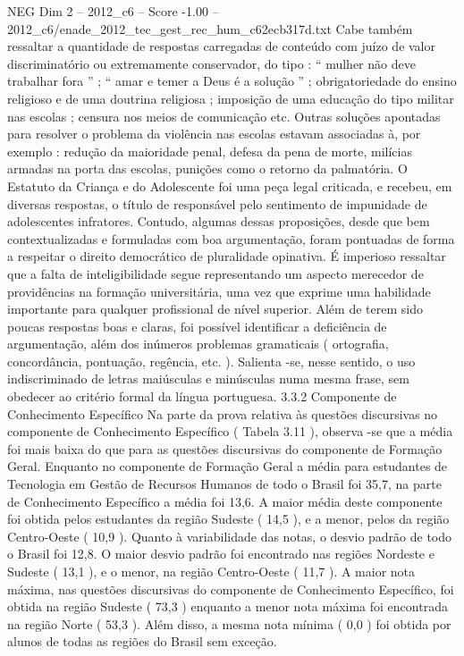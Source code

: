 \begin{textsample}{NEG Dim 2 – 2012\_c6 – Score -1.00 – 2012\_c6/enade\_2012\_tec\_gest\_rec\_hum\_c62ecb317d.txt}
Cabe também ressaltar a quantidade de respostas carregadas de conteúdo com juízo de valor discriminatório ou extremamente conservador, do tipo : “ mulher não deve trabalhar fora ” ; “ amar e temer a Deus é a solução ” ; obrigatoriedade do ensino religioso e de uma doutrina religiosa ; imposição de uma educação do tipo militar nas escolas ; censura nos meios de comunicação etc.
Outras soluções apontadas para resolver o problema da violência nas escolas estavam associadas à, por exemplo : redução da maioridade penal, defesa da pena de morte, milícias armadas na porta das escolas, punições como o retorno da palmatória.
O Estatuto da Criança e do Adolescente foi uma peça legal criticada, e recebeu, em diversas respostas, o título de responsável pelo sentimento de impunidade de adolescentes infratores.
Contudo, algumas dessas proposições, desde que bem contextualizadas e formuladas com boa argumentação, foram pontuadas de forma a respeitar o direito democrático de pluralidade opinativa.
É imperioso ressaltar que a falta de inteligibilidade segue representando um aspecto merecedor de providências na formação universitária, uma vez que exprime uma habilidade importante para qualquer profissional de nível superior.
Além de terem sido poucas respostas boas e claras, foi possível identificar a deficiência de argumentação, além dos inúmeros problemas gramaticais ( ortografia, concordância, pontuação, regência, etc. ).
Salienta -se, nesse sentido, o uso indiscriminado de letras maiúsculas e minúsculas numa mesma frase, sem obedecer ao critério formal da língua portuguesa. 3.3.2 Componente de Conhecimento Específico Na parte da prova relativa às questões discursivas no componente de Conhecimento Específico ( Tabela 3.11 ), observa -se que a média foi mais baixa do que para as questões discursivas do componente de Formação Geral.
Enquanto no componente de Formação Geral a média para estudantes de Tecnologia em Gestão de Recursos Humanos de todo o Brasil foi 35,7, na parte de Conhecimento Específico a média foi 13,6.
A maior média deste componente foi obtida pelos estudantes da região Sudeste ( 14,5 ), e a menor, pelos da região Centro-Oeste ( 10,9 ).
Quanto à variabilidade das notas, o desvio padrão de todo o Brasil foi 12,8.
O maior desvio padrão foi encontrado nas regiões Nordeste e Sudeste ( 13,1 ), e o menor, na região Centro-Oeste ( 11,7 ).
A maior nota máxima, nas questões discursivas do componente de Conhecimento Específico, foi obtida na região Sudeste ( 73,3 ) enquanto a menor nota máxima foi encontrada na região Norte ( 53,3 ).
Além disso, a mesma nota mínima ( 0,0 ) foi obtida por alunos de todas as regiões do Brasil sem exceção.

\end{textsample}
